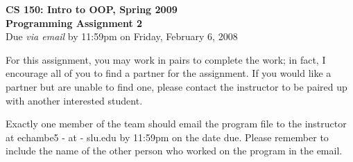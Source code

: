 \documentclass[11pt]{article}
\begin{document}

\begin{center}
\LARGE \textbf{CS 150: Intro to OOP, Spring 2009}
\\
\textbf{Programming Assignment 2}
\\[1ex]
\Large Due \emph{via email} by 11:59pm on Friday, February 6, 2008\\

\end{center}

For this assignment, you may work in pairs to complete the work; in
fact, I encourage all of you to find a partner for the assignment.
If you would like a partner but are unable to find one, please
contact the instructor to be paired up with another interested
student.

Exactly one member of the team should email the program file to the
instructor at echambe5 - at - slu.edu by 11:59pm on the date due.
Please remember to include the name of the other person who worked
on the program in the email.
\end{document}
